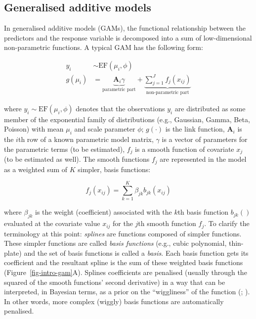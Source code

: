 \documentclass[
  doc,
  floatsintext,
  longtable,
  a4paper,
  nolmodern,
  notxfonts,
  notimes,
  donotrepeattitle,
  colorlinks=true,linkcolor=blue,citecolor=blue,urlcolor=blue]{apa7}
\begin{document}
\subsection{Generalised additive
models}\label{generalised-additive-models}

In generalised additive models (GAMs), the functional relationship
between the predictors and the response variable is decomposed into a
sum of low-dimensional non-parametric functions. A typical GAM has the
following form:

\[
\begin{aligned} 
y_{i} &\sim \mathrm{EF}\left(\mu_{i}, \phi\right)\\
g\left(\mu_i\right) &= \underbrace{\mathbf{A}_{i} \gamma}_{\text{parametric part}} + \underbrace{\sum_{j=1}^{J} f_{j}\left(x_{ij}\right)}_{\text{non-parametric part}}
\end{aligned}
\]

where \(y_{i} \sim \mathrm{EF}\left(\mu_{i}, \phi\right)\) denotes that
the observations \(y_{i}\) are distributed as some member of the
exponential family of distributions (e.g., Gaussian, Gamma, Beta,
Poisson) with mean \(\mu_{i}\) and scale parameter \(\phi\);
\(g(\cdot)\) is the link function, \(\mathbf{A}_{i}\) is the \(i\)th row
of a known parametric model matrix, \(\gamma\) is a vector of parameters
for the parametric terms (to be estimated), \(f_{j}\) is a smooth
function of covariate \(x_{j}\) (to be estimated as well). The smooth
functions \(f_{j}\) are represented in the model as a weighted sum of
\(K\) simpler, basis functions:

\[
f_{j}\left(x_{i j}\right) = \sum_{k=1}^K \beta_{jk} b_{jk}\left(x_{ij}\right)
\]

where \(\beta_{jk}\) is the weight (coefficient) associated with the
\(k\)th basis function \(b_{jk}()\) evaluated at the covariate value
\(x_{ij}\) for the \(j\)th smooth function \(f_{j}\). To clarify the
terminology at this point: \emph{splines} are functions composed of
simpler functions. These simpler functions are called \emph{basis
functions} (e.g., cubic polynomial, thin-plate) and the set of basis
functions is called a \emph{basis}. Each basis function gets its
coefficient and the resultant spline is the sum of these weighted basis
functions (Figure~\ref{fig-intro-gam}\ignorespaces A). Splines
coefficients are penalised (usually through the squared of the smooth
functions' second derivative) in a way that can be interpreted, in
Bayesian terms, as a prior on the ``wiggliness'' of the function
(; ). In other words, more complex (wiggly) basis functions are
automatically penalised.
\end{document}
